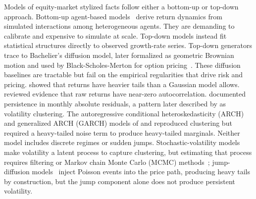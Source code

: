 
Models of equity-market stylized facts follow either a bottom-up or
top-down approach. Bottom-up agent-based models~\cite{luxMarchesi1999,
contBouchaud2000, farmerJoshi2002, lebaron2006, arthur2021,
farmer2025} derive return dynamics from simulated interactions among
heterogeneous agents. They are demanding to calibrate and expensive
to simulate at scale. Top-down models instead fit statistical
structures directly to observed growth-rate series.
Top-down generators trace to Bachelier's diffusion model, later
formalized as geometric Brownian motion and used by
Black-Scholes-Merton for option
pricing~\cite{bachelier1900, osborne1959, samuelson1965,
blackScholes1973}. These diffusion baselines are tractable but fail
on the empirical regularities that drive risk and pricing.
\citet{mandelbrot1963} showed that returns have heavier tails than a
Gaussian model allows. \citet{famaEMH1970} reviewed evidence that raw
returns have near-zero autocorrelation. \citet{schwert1989}
documented persistence in monthly absolute residuals, a pattern later
described by \citet{cont2001} as volatility clustering. The autoregressive
conditional heteroskedasticity (ARCH) and generalized ARCH (GARCH)
models of \citet{engle1982} and \citet{bollerslev1986}
reproduced clustering but required a heavy-tailed noise term to
produce heavy-tailed marginals. Neither model includes discrete
regimes or sudden jumps. Stochastic-volatility
models~\cite{steinStein1991, heston1993} make volatility a latent
process to capture clustering, but estimating that process requires
filtering or Markov chain Monte Carlo (MCMC)
methods~\cite{kimShephardChib1998}; jump-diffusion
models~\cite{merton1976, kou2002} inject Poisson events into the
price path, producing heavy tails by construction, but the jump
component alone does not produce persistent volatility.

